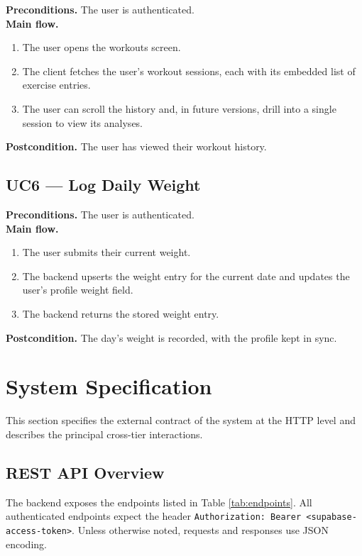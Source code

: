 \textbf{Preconditions.} The user is authenticated.\\
\textbf{Main flow.}
\begin{enumerate}
    \item The user opens the workouts screen.
    \item The client fetches the user's workout sessions, each with its embedded list of exercise entries.
    \item The user can scroll the history and, in future versions, drill into a single session to view its analyses.
\end{enumerate}
\textbf{Postcondition.} The user has viewed their workout history.

\subsection{UC6 --- Log Daily Weight}
\label{subsec:uc6}

\textbf{Preconditions.} The user is authenticated.\\
\textbf{Main flow.}
\begin{enumerate}
    \item The user submits their current weight.
    \item The backend upserts the weight entry for the current date and updates the user's profile weight field.
    \item The backend returns the stored weight entry.
\end{enumerate}
\textbf{Postcondition.} The day's weight is recorded, with the profile kept in sync.

\section{System Specification}
\label{sec:system-spec}

This section specifies the external contract of the system at the HTTP level and describes the principal cross-tier interactions.

\subsection{REST API Overview}
\label{subsec:rest-overview}

The backend exposes the endpoints listed in Table \ref{tab:endpoints}. All authenticated endpoints expect the header \texttt{Authorization: Bearer <supabase-access-token>}. Unless otherwise noted, requests and responses use JSON encoding.

